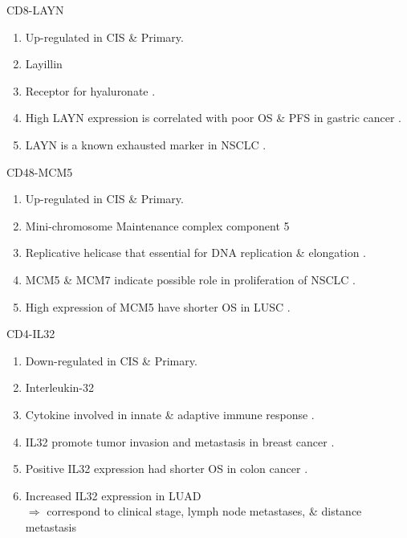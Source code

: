 \documentclass{beamer}
\begin{document}
\begin{frame}[allowframebreaks]
        \begin{block}{CD8-LAYN}
            \begin{enumerate}
                \item Up-regulated in CIS \& Primary.
                \item Layillin
                \item Receptor for hyaluronate \cite{LAYN-1}.
                \item High LAYN expression is correlated with poor OS \& PFS in gastric cancer \cite{LAYN-2}.
                \item LAYN is a known exhausted marker in NSCLC \cite{LAYN-3}.
            \end{enumerate}
        \end{block}

        \begin{block}{CD48-MCM5}
            \begin{enumerate}
                \item Up-regulated in CIS \& Primary.
                \item Mini-chromosome Maintenance complex component 5
                \item Replicative helicase that essential for DNA replication \& elongation \cite{MCM5-1, MCM5-2}.
                \item MCM5 \& MCM7 indicate possible role in proliferation of NSCLC \cite{MCM5-3}.
                \item High expression of MCM5 have shorter OS in LUSC \cite{MCM5-4}.
            \end{enumerate}
        \end{block}

        \begin{block}{CD4-IL32}
            \begin{enumerate}
                \item Down-regulated in CIS \& Primary.
                \item Interleukin-32
                \item Cytokine involved in innate \& adaptive immune response \cite{IL32-1}.
                \item IL32 promote tumor invasion and metastasis in breast cancer \cite{IL32-2}.
                \item Positive IL32 expression had shorter OS in colon cancer \cite{IL32-3}.
                \item Increased IL32 expression in LUAD \cite{IL32-4} \\
                    $\Rightarrow$ correspond to clinical stage, lymph node metastases, \& distance metastasis
            \end{enumerate}
        \end{block}


\end{frame}
\end{document}
